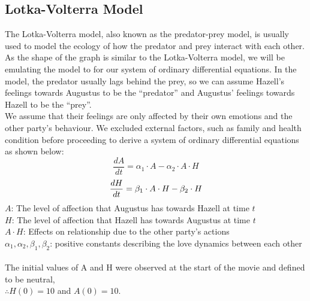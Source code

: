 \documentclass{article}
\newcommand*\circled[1]{\tikz[baseline=(char.base)]{
            \node[shape=circle,draw,inner sep=2pt] (char) {#1};}}
\begin{document}
\subsection*{\circled{3.1} Lotka-Volterra Model}
The Lotka-Volterra model, also known as the predator-prey model, is usually used to model the ecology of how the predator and prey interact with each other. As the shape of the graph is similar to the Lotka-Volterra model, we will be emulating the model to for our system of ordinary differential equations. In the model, the predator usually lags behind the prey, so we can assume Hazell's feelings towards Augustus to be the ``predator'' and Augustus' feelings towards Hazell to be the ``prey''. \\
\newline
\noindent
We assume that their feelings are only affected by their own emotions and the other party's behaviour. We excluded external factors, such as family and health condition before proceeding to derive a system of ordinary differential equations as shown below:
\begin{equation*}
    \frac{dA}{dt} =\alpha_1\cdot A-\alpha_2\cdot A\cdot H
    \end{equation*}
    \begin{equation*}
    \frac{dH}{dt} =\beta_1\cdot A\cdot H-\beta_2\cdot H\\
\end{equation*}
$A$: The level of affection that Augustus has towards Hazell at time $t$ \\
$H$: The level of affection that Hazell has towards Augustus at time $t$\\
$A\cdot H$: Effects on relationship due to the other party's actions\\
$\alpha_1,\alpha_2,\beta_1,\beta_2$:  positive constants describing the love dynamics between each other\\
\\
The initial values of A and H were observed at the start of the movie and defined to be neutral, \\
$\therefore H(0) = 10$ and $A(0) = 10$.
\end{document}

